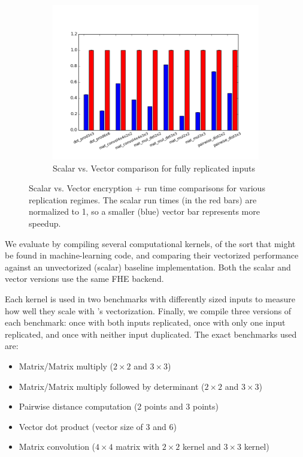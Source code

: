 \begin{figure}
     \vspace{-2.5em}
     
    \begin{subfigure}{\linewidth}
        \includegraphics[width=1\textwidth]{figures/newAspectRatioGraphs/DataReplicatedENC+RUN.png}
            \vspace{-3em}
        \caption{Scalar vs. Vector comparison for fully replicated inputs}\label{fig:ml-kernels-repl}
    \end{subfigure}
    \caption{Scalar vs. Vector encryption + run time comparisons for various replication regimes. The scalar run times (in the red bars) are normalized to 1, so a smaller (blue) vector bar represents more speedup.}\label{fig:ml-kernels}
\end{figure}

We evaluate \system by compiling several computational kernels, of the sort that might be found in machine-learning code, and comparing their vectorized performance against an unvectorized (scalar) baseline implementation. Both the scalar and vector versions use the same FHE backend.

Each kernel is used in two benchmarks with differently sized inputs to measure how well they scale with \system's vectorization.
Finally, we compile three versions of each benchmark: once with both inputs replicated, once with only one input replicated, and once with neither input duplicated. 
The exact benchmarks used are:
\begin{itemize}
    \item Matrix/Matrix multiply ($2 \times 2$ and $3 \times 3$)
    \item Matrix/Matrix multiply followed by determinant ($2 \times 2$ and $3 \times 3$)
    \item Pairwise distance computation (2 points and 3 points)
    \item Vector dot product (vector size of 3 and 6)
    \item Matrix convolution ($4 \times 4$ matrix with $2 \times 2$ kernel and $3 \times 3$ kernel)
\end{itemize}

